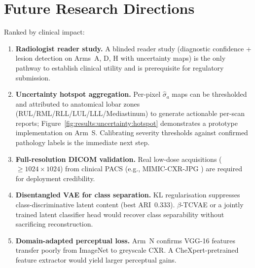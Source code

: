 \documentclass[12pt, a4paper, twoside, openright]{book}
\begin{document}
\section{Future Research Directions}
\label{sec:disc:future}

Ranked by clinical impact:

\begin{enumerate}
  \item \textbf{Radiologist reader study.} A blinded reader study (diagnostic confidence + lesion detection on Arms~A, D, H with uncertainty maps) is the only pathway to establish clinical utility and is prerequisite for regulatory submission.

  \item \textbf{Uncertainty hotspot aggregation.} Per-pixel $\hat{\sigma}_a$ maps can be thresholded and attributed to anatomical lobar zones (RUL/RML/RLL/LUL/LLL/Mediastinum) to generate actionable per-scan reports; Figure~\ref{fig:results:uncertainty:hotspot} demonstrates a prototype implementation on Arm~S. Calibrating severity thresholds against confirmed pathology labels is the immediate next step.

  \item \textbf{Full-resolution DICOM validation.} Real low-dose acquisitions ($\geq1024\times1024$) from clinical PACS (e.g., MIMIC-CXR-JPG \cite{johnson_mimic_2019}) are required for deployment credibility.

  \item \textbf{Disentangled VAE for class separation.} KL regularisation suppresses class-discriminative latent content (best ARI~$0.333$). $\beta$-TCVAE or a jointly trained latent classifier head would recover class separability without sacrificing reconstruction.

  \item \textbf{Domain-adapted perceptual loss.} Arm~N confirms VGG-16 features transfer poorly from ImageNet to greyscale CXR. A CheXpert-pretrained feature extractor would yield larger perceptual gains.
\end{enumerate}
\end{document}
